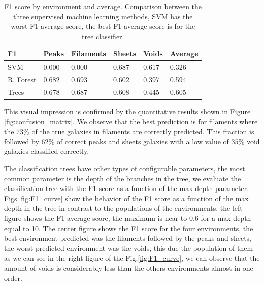 \documentclass[usenatbib]{mnras}
\begin{document}
\begin{table}
\centering
\begin{tabular}{l|l|l|l|l|l|}
 F1 & Peaks & Filaments & Sheets & Voids & Average \\ \hline
\multicolumn{1}{|l|}{SVM} & 0.000 & 0.000 & 0.687 & 0.617 & 0.326 \\ \hline
\multicolumn{1}{|l|}{R. Forest} & 0.682 & 0.693 & 0.602 & 0.397 & 0.594 \\ \hline
\multicolumn{1}{|l|}{Trees} & 0.678 & 0.687 & 0.608 & 0.445 & 0.605 \\ \hline
\end{tabular}
\caption{F1 score by environment and average. Comparison between the three supervised machine learning methods, SVM has the worst F1 average score, the best F1 average score is for the tree classifier.}
\label{tab:methods}
\end{table}

This visual impression is confirmed by the quantitative results shown in Figure \ref{fig:confusion_matrix}.
We observe that the best prediction is for filaments where the $73\%$ of the true galaxies in filaments are correctly predicted. 
This fraction is followed by $62\%$ of correct peaks and sheets galaxies with
a low value of $35\%$ void galaxies classified correctly.


The classification trees have other types of configurable parameters, the most common parameter is the depth of the branches in the tree, we evaluate the classification tree with the F1 score as a function of the max depth parameter. 
Figs.\ref{fig:F1_curve} show the behavior of the F1 score as a function of the max depth in the tree in contrast to the populations of the environments, the left figure shows the F1 average score, the maximum is near to 0.6 for a max depth equal to 10. 
The center figure shows the F1 score for the four environments, the best environment predicted was the filaments followed by the peaks and sheets, the worst predicted environment was the voids, this due the population of them as we can see in the right figure of the Fig.\ref{fig:F1_curve}, we can observe that the amount of voids is considerably less than the others environments almost in one order.
\end{document}
